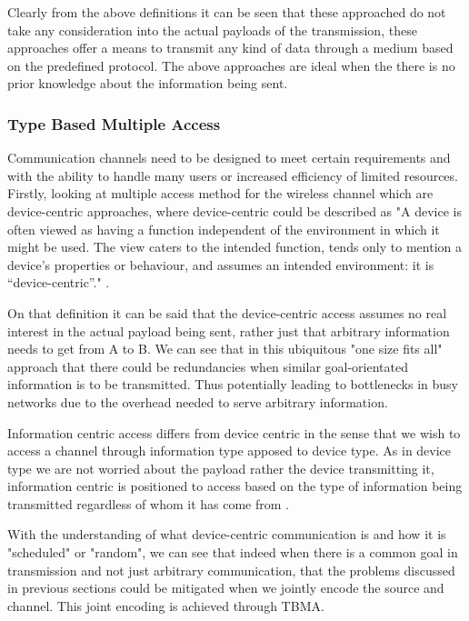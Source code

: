 \documentclass{article}
\begin{document}
Clearly from the above definitions it can be seen that these approached do not take any consideration into the actual payloads of the transmission, these approaches offer a means to transmit any kind of data through a medium based on the predefined protocol. The above approaches are ideal when the there is no prior knowledge about the information being sent.

\subsubsection{Type Based Multiple Access}

Communication channels need to be designed to meet certain requirements and with the ability to handle many users or increased efficiency of limited resources. Firstly, looking at multiple access method for the wireless channel which are device-centric approaches, where device-centric could be described as "A device is often viewed as having a function independent of the environment in which it might be used. The view caters to the intended function, tends only to mention a device’s properties or behaviour, and assumes an intended environment: it is “device-centric”." \cite{device-centric}.

On that definition it can be said that the device-centric access assumes no real interest in the actual payload being sent, rather just that arbitrary information needs to get from A to B. We can see that in this ubiquitous "one size fits all" approach that there could be redundancies when similar goal-orientated information is to be transmitted. Thus potentially leading to bottlenecks in busy networks due to the overhead needed to serve arbitrary information. 

Information centric access differs from device centric in the sense that we wish to access a channel through information type apposed to device type. As in device type we are not worried about the payload rather the device transmitting it, information centric is positioned to access based on the type of information being transmitted regardless of whom it has come from \cite{information_centric}.

With the understanding of what device-centric communication is and how it is "scheduled" or "random", we can see that indeed when there is a common goal in transmission and not just arbitrary communication, that the problems discussed in previous sections could be mitigated when we jointly encode the source and channel. This joint encoding is achieved through \ac{TBMA}. 
\end{document}

